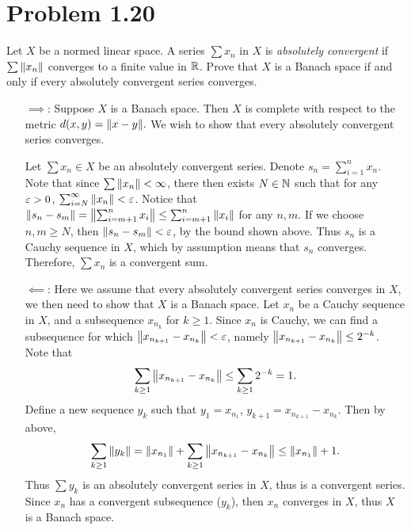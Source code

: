 \section{Problem 1.20}
Let $X$ be a normed linear space. A series $\sum x_n$ in $X$ is \textit{absolutely convergent} if $\sum \norm{x_n}$ converges to a finite value in $\mathbb{R}$. Prove that $X$ is a Banach space if and only if every absolutely convergent series converges.
\partbreak

\begin{solution}

\begin{itemize}
    \item [\underline{$\implies$}:] Suppose $X$ is a Banach space. Then $X$ is complete with respect to the metric $d(x, y) = \norm{x - y}.$ We wish to show that every absolutely convergent series converges.\par

    Let $\sum x_n \in X$ be an absolutely convergent series. Denote $s_n = \sum_{i = 1}^n x_n$. Note that since $\sum \norm{x_n} < \infty$, there then exists $N \in \mathbb{N}$ such that for any $\varepsilon > 0$, $\sum_{i = N}^\infty \norm{x_n} < \varepsilon$. Notice that $\norm{s_n - s_m} = \norm{\sum_{i = m+1}^n x_i} \leq \sum_{i = m+1}^n\norm{x_i}$ for any $n, m$. If we choose $n, m \geq N$, then $\norm{s_n - s_m} < \varepsilon$, by the bound shown above. Thus $s_n$ is a Cauchy sequence in $X$, which by assumption means that $s_n$ converges. Therefore, $\sum x_n$ is a convergent sum. 

    \item [\underline{$\impliedby$}:] Here we assume that every absolutely convergent series converges in $X$, we then need to show that $X$ is a Banach space. Let $x_n$ be a Cauchy sequence in $X$, and a subsequence $x_{n_k}$ for $k \geq 1$. Since $x_n$ is Cauchy, we can find a subsequence for which $\norm{x_{n_{k+1}} - x_{n_k}} < \varepsilon$, namely $\norm{x_{n_{k+1}} - x_{n_k}} \leq 2^{-k}$. Note that 
    \[
    \sum_{k \geq 1} \norm{x_{n_{k+1}} - x_{n_k}} \leq \sum_{k \geq 1} 2^{-k} = 1.
    \]
    Define a new sequence $y_k$ such that $y_1 = x_{n_1}$, $y_{k+1} = x_{n_{k+1}} - x_{n_k}$. Then by above, 
    \[
    \sum_{k \geq 1}\norm{y_k} = \norm{x_{n_1}} + \sum_{k \geq 1} \norm{x_{n_{k+1}} - x_{n_k}} \leq \norm{x_{n_1}} + 1.
    \]
    Thus $\sum y_k$ is an absolutely convergent series in $X$, thus is a convergent series. Since $x_n$ has a convergent subsequence ($y_k$), then $x_n$ converges in $X$, thus $X$ is a Banach space. 
\end{itemize}
\end{solution}

